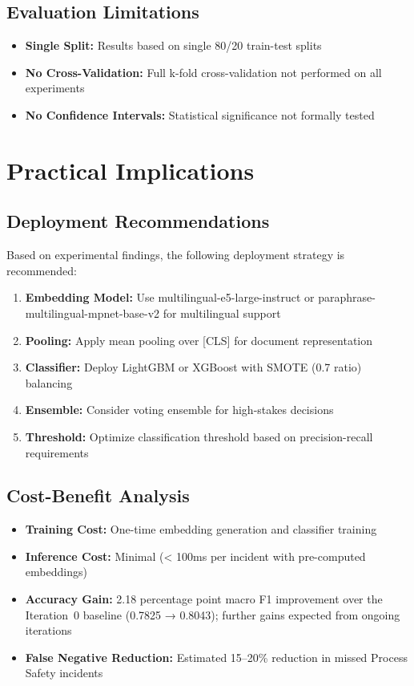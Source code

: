 \documentclass[11pt, titlepage, bibliography=totoc]{scrreprt}
\begin{document}
\subsection{Evaluation Limitations}
\begin{itemize}
    \item \textbf{Single Split:} Results based on single 80/20 train-test splits
    \item \textbf{No Cross-Validation:} Full k-fold cross-validation not performed on all experiments
    \item \textbf{No Confidence Intervals:} Statistical significance not formally tested
\end{itemize}

\section{Practical Implications}

\subsection{Deployment Recommendations}
Based on experimental findings, the following deployment strategy is recommended:

\begin{enumerate}
    \item \textbf{Embedding Model:} Use multilingual-e5-large-instruct or paraphrase-multilingual-mpnet-base-v2 for multilingual support
    \item \textbf{Pooling:} Apply mean pooling over [CLS] for document representation
    \item \textbf{Classifier:} Deploy LightGBM or XGBoost with SMOTE (0.7 ratio) balancing
    \item \textbf{Ensemble:} Consider voting ensemble for high-stakes decisions
    \item \textbf{Threshold:} Optimize classification threshold based on precision-recall requirements
\end{enumerate}

\subsection{Cost-Benefit Analysis}
\begin{itemize}
    \item \textbf{Training Cost:} One-time embedding generation and classifier training
    \item \textbf{Inference Cost:} Minimal (< 100ms per incident with pre-computed embeddings)
    \item \textbf{Accuracy Gain:} 2.18 percentage point macro F1 improvement over the Iteration~0 baseline (0.7825 → 0.8043); further gains expected from ongoing iterations
    \item \textbf{False Negative Reduction:} Estimated 15--20\% reduction in missed Process Safety incidents
\end{itemize}
\end{document}

